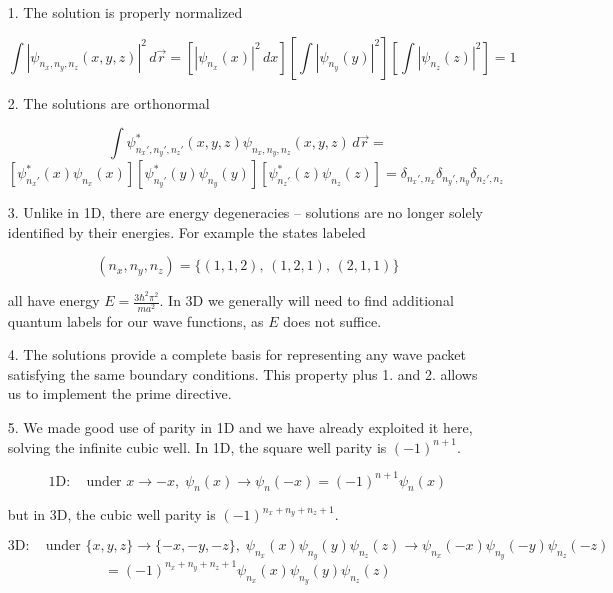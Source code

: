 \begin{itemize}
  \item[1.] The solution is properly normalized

    \[
      \int |\psi_{n_x, n_y, n_z} (x, y, z) |^2 \, d\vec{r} = \left[
      |\psi_{n_x}(x)|^2 \, dx \right] \left[ \int |\psi_{n_y} (y) |^2 \right]
      \left[ \int | \psi_{n_z}(z) |^2 \right] = 1
    \] \vspace{3px}
    \item[2.] The solutions are orthonormal 
  
  \[
    \int \psi^*_{n_x', n_y', n_z'} (x, y, z) \psi_{n_x, n_y, n_z} (x, y, z) \,
    d\vec{r} = 
    \] \[ \left[ \psi_{n_x'}^* (x) \psi_{n_x}(x) \right] \left[ \psi_{n_y'}^*
    (y) \psi_{n_y}(y) \right]
    \left[ \psi_{n_z'}^* (z) \psi_{n_z}(z) \right] = \delta_{n_x', n_x}
    \delta_{n_y', n_y} \delta_{n_z', n_z} \] \vspace{3px}

  \item[3.] Unlike in 1D, there are energy degeneracies -- solutions are no
    longer solely identified by their energies. For example the states labeled 

    \[
      (n_x, n_y, n_z) = \{ (1, 1, 2),\, (1, 2, 1),\, (2, 1, 1)\}
    \] \vspace{3px}
    
    all have energy $E = \frac{3\hbar^2\pi^2}{ma^2}$. In 3D we generally will
    need to find additional quantum labels for our wave functions, as $E$ does
    not suffice. 
  \item[4.] The solutions provide a complete basis for representing any wave
    packet satisfying the same boundary conditions. This property plus 1. and
    2. allows us to implement the prime directive. 
  \item[5.] We made good use of parity in 1D and we have already exploited it
    here, solving the infinite cubic well. In 1D, the square well parity is
    $(-1)^{n+1}$. 

     \[
    \text{1D} : \quad \text{under } x \rightarrow -x, \; \psi_n(x) \rightarrow
    \psi_n(-x) = (-1)^{n+1}\psi_n(x)
    \] \vspace{3px}
    
    but in 3D, the cubic well parity is $(-1)^{n_x + n_y + n_z + 1}$. 

     \[
       \text{3D} : \quad \text{under } \{ x, y, z\} \rightarrow \{-x, -y, -z\},
       \; \psi_{n_x}(x) \psi_{n_y}(y) \psi_{n_z}(z) \rightarrow \psi_{n_x}(-x)
       \psi_{n_y}(-y) \psi_{n_z}(-z)
       \] \[ = (-1)^{n_x+ n_y+n_z+1} \psi_{n_x}(x)
     \psi_{n_y}(y) \psi_{n_z}(z)\]
\end{itemize}

